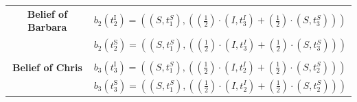 \documentclass{article}
\begin{document}
\begin{description}
\begin{center}
\begin{tabular}{cl}
        \multicolumn{ 1}{c}{{\bf Belief of Barbara}} &         $b_2\left(t_2^{\text{I}}\right)=\left(\left(S,t_1^S\right),\left(\left(\frac{1}{2}\right)\cdot \left(I,t_3^I\right)+\left(\frac{1}{2}\right)\cdot \left(S,t_3^S\right)\right)\right)$\\

        \multicolumn{ 1}{c}{{\bf }} &         $b_2\left(t_2^{\text{S}}\right)=\left(\left(S,t_1^S\right),\left(\left(\frac{1}{2}\right)\cdot \left(I,t_3^I\right)+\left(\frac{1}{2}\right)\cdot \left(S,t_3^S\right)\right)\right)$ \\\\

        \multicolumn{ 1}{c}{{\bf Belief of Chris}} &         $b_3\left(t_3^{\text{I}}\right)=\left(\left(S,t_1^S\right),\left(\left(\frac{1}{2}\right)\cdot \left(I,t_2^I\right)+\left(\frac{1}{2}\right)\cdot \left(S,t_2^S\right)\right)\right)$ \\

        \multicolumn{ 1}{c}{{\bf }} &         $b_3\left(t_3^{\text{S}}\right)=\left(\left(S,t_1^S\right),\left(\left(\frac{1}{2}\right)\cdot \left(I,t_2^I\right)+\left(\frac{1}{2}\right)\cdot \left(S,t_2^S\right)\right)\right)$ \\


\end{tabular}
\end{center}
\end{description}
\end{document}
